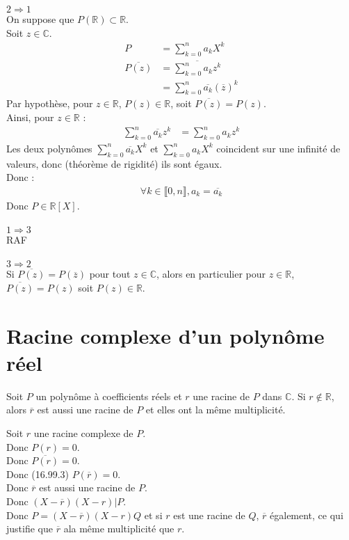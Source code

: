 \documentclass[../main.tex]{subfiles}
\begin{document}
$\boxed{2 \Rightarrow 1}$ \\
On suppose que $P(\mathbb{R}) \subset \mathbb{R}$. \\
Soit $z \in \mathbb{C}$. 
\begin{align*}
    P &= \sum_{k=0}^{n} a_k X^k \\
    \overline{P(z)} &= \overline{\sum_{k=0}^{n} a_k z^k} \\
    &= \sum_{k=0}^{n} \overline{a_k} (\overline{z})^k 
\end{align*}
Par hypothèse, pour $z \in \mathbb{R}$, $P(z) \in \mathbb{R}$, soit $\overline{P(z)} = P(z)$. \\
Ainsi, pour $z \in \mathbb{R}$ : 
\begin{align*}
    \sum_{k=0}^{n} \overline{a_k} z^k &= \sum_{k=0}^{n} a_k z^k
\end{align*}
Les deux polynômes $\sum\limits_{k=0}^{n} \overline{a_k} X^k$ et $\sum\limits_{k=0}^{n} a_k X^k$ coincident sur une infinité de valeurs, donc (théorème de rigidité) ils sont égaux. \\
Donc : 
\begin{align*}
    \forall k \in \llbracket 0, n \rrbracket, a_k = \overline{a_k}
\end{align*}
Donc $P \in \mathbb{R}[X]$. \\ \\

$\boxed{1 \Rightarrow 3}$ \\
RAF \\ \\

$\boxed{3 \Rightarrow 2}$ \\
Si $\overline{P(z)} = P(\overline{z})$ pour tout $z \in \mathbb{C}$, alors en particulier pour $z \in \mathbb{R}$, $\overline{P(z)} = P(z)$ soit $P(z) \in \mathbb{R}$.

\section{Racine complexe d'un polynôme réel}
\begin{tcolorbox}[title=Corollaire 16.100, title filled=false, colframe=orange, colback=orange!10!white]
   Soit $P$ un polynôme à coefficients réels et $r$ une racine de $P$ dans $\mathbb{C}$. Si $r \not \in \mathbb{R}$, alors $\overline{r}$ est aussi une racine de $P$ et elles ont la même multiplicité. 
\end{tcolorbox}

\noindent Soit $r$ une racine complexe de $P$. \\
Donc $P(r) = 0$. \\
Donc $\overline{P(r)} = 0$. \\
Donc (16.99.3) $P(\overline{r}) = 0$. \\
Donc $\overline{r}$ est aussi une racine de $P$. \\
Donc $(X - \overline{r})(X - r) | P$. \\
Donc $P = (X - \overline{r})(X - r)Q$ et si $r$ est une racine de $Q$, $\overline{r}$ également, ce qui justifie que $\overline{r}$ ala même multiplicité que $r$. 
\end{document}
